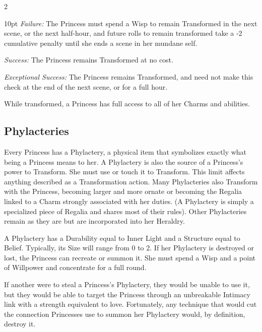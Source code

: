 \begin{multicols}{2}
\begin{myindentpar}{10pt}
    \emph{Failure:} The Princess must spend a Wisp to remain Transformed in the next scene, or the next half-hour, and future rolls to remain transformed take a -2 cumulative penalty until she ends a scene in her mundane self. 
    
    \emph{Success:} The Princess remains Transformed at no cost. 
    
    \emph{Exceptional Success:} The Princess remains Transformed, and need not make this check at the end of the next scene, or for a full hour. 
\end{myindentpar}

While transformed, a Princess has full access to all of her Charms and abilities. 

\subsection*{Phylacteries}

Every Princess has a Phylactery, a physical item that symbolizes exactly what being a Princess means to her. A Phylactery is also the source of a Princess's power to Transform. She must use or touch it to Transform. This limit affects anything described as a Transformation action. Many Phylacteries also Transform with the Princess, becoming larger and more ornate or becoming the Regalia linked to a Charm strongly associated with her duties. (A Phylactery is simply a specialized piece of Regalia and shares most of their rules). Other Phylacteries remain as they are but are incorporated into her Heraldry. 

A Phylactery has a Durability equal to Inner Light and a Structure equal to Belief. Typically, its Size will range from 0 to 2. If her Phylactery is destroyed or lost, the Princess can recreate or summon it. She must spend a Wisp and a point of Willpower and concentrate for a full round. 

If another were to steal a Princess's Phylactery, they would be unable to use it, but they would be able to target the Princess through an unbreakable Intimacy link with a strength equivalent to love. Fortunately, any technique that would cut the connection Princesses use to summon her Phylactery would, by definition, destroy it.


\end{multicols}
